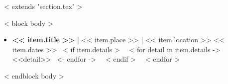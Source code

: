 ~< extends "section.tex" >~

~< block body >~
  \begin{itemize}
    ~< for item in items >~
      \item \textbf{<< item.title >>} | << item.place >> | << item.location >> \hfill << item.dates >>
        ~< if item.details >~
            ~< for detail in item.details ->~
                ~\\ <<detail>>
            ~<- endfor ->~
        ~< endif >~
    ~< endfor >~
  \end{itemize}
~< endblock body >~
